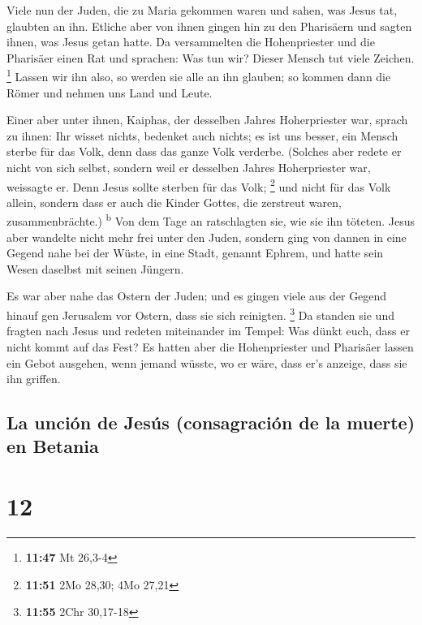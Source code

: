  Viele nun der Juden, die zu Maria gekommen waren und
sahen, was Jesus tat, glaubten an ihn.  Etliche aber von
ihnen gingen hin zu den Pharisäern und sagten ihnen, was Jesus getan
hatte.  Da versammelten die Hohenpriester und die
Pharisäer einen Rat und sprachen: Was tun wir? Dieser Mensch tut viele
Zeichen. \footnote{\textbf{11:47} Mt 26,3-4}  Lassen wir
ihn also, so werden sie alle an ihn glauben; so kommen dann die Römer
und nehmen uns Land und Leute.

 Einer aber unter ihnen, Kaiphas, der desselben Jahres
Hoherpriester war, sprach zu ihnen: Ihr wisset nichts, 
bedenket auch nichts; es ist uns besser, ein Mensch sterbe für das Volk,
denn dass das ganze Volk verderbe.  (Solches aber redete
er nicht von sich selbst, sondern weil er desselben Jahres Hoherpriester
war, weissagte er. Denn Jesus sollte sterben für das Volk; \footnote{\textbf{11:51}
  2Mo 28,30; 4Mo 27,21}  und nicht für das Volk allein,
sondern dass er auch die Kinder Gottes, die zerstreut waren,
zusammenbrächte.) \textsuperscript{b}  Von dem Tage an
ratschlagten sie, wie sie ihn töteten.  Jesus aber
wandelte nicht mehr frei unter den Juden, sondern ging von dannen in
eine Gegend nahe bei der Wüste, in eine Stadt, genannt Ephrem, und hatte
sein Wesen daselbst mit seinen Jüngern.

 Es war aber nahe das Ostern der Juden; und es gingen
viele aus der Gegend hinauf gen Jerusalem vor Ostern, dass sie sich
reinigten. \footnote{\textbf{11:55} 2Chr 30,17-18}  Da
standen sie und fragten nach Jesus und redeten miteinander im Tempel:
Was dünkt euch, dass er nicht kommt auf das Fest?  Es
hatten aber die Hohenpriester und Pharisäer lassen ein Gebot ausgehen,
wenn jemand wüsste, wo er wäre, dass er's anzeige, dass sie ihn griffen.

\hypertarget{la-unciuxf3n-de-jesuxfas-consagraciuxf3n-de-la-muerte-en-betania}{%
\subsection{La unción de Jesús (consagración de la muerte) en
Betania}\label{la-unciuxf3n-de-jesuxfas-consagraciuxf3n-de-la-muerte-en-betania}}

\hypertarget{section-11}{%
\section{12}\label{section-11}}

